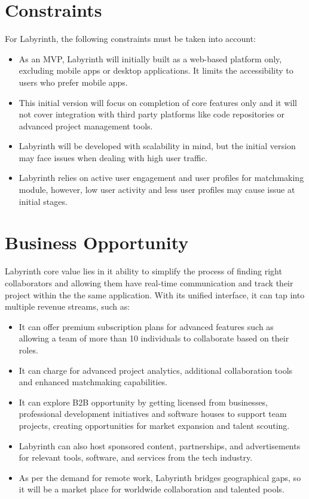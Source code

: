 \documentclass{FastFyp}
\begin{document}
\section{Constraints}
For Labyrinth, the following constraints must be taken into account:
\begin{itemize}
    \item As an MVP, Labyrinth will initially built as a web-based platform only, excluding mobile apps or desktop applications. It limits the accessibility to users who prefer mobile apps.
    \item This initial version will focus on completion of core features only and it will not cover integration with third party platforms like code repositories or advanced project management tools.
    \item Labyrinth will be developed with scalability in mind, but the initial version may face issues when dealing with high user traffic.
    \item Labyrinth relies on active user engagement and user profiles for matchmaking module, however, low user activity and less user profiles may cause issue at initial stages.
\end{itemize}
\section{Business Opportunity}
Labyrinth core value lies in it ability to simplify the process of finding right collaborators and allowing them have real-time communication and track their project within the the same application. With its unified interface, it can tap into multiple revenue streams, such as:
\begin{itemize}
    \item It can offer premium subscription plans for advanced features such as allowing a team of more than 10 individuals to collaborate based on their roles.
    \item It can charge for advanced project analytics, additional collaboration tools and enhanced matchmaking capabilities.
    \item It can explore B2B opportunity by getting licensed from businesses, professional development initiatives and software houses to support team projects, creating opportunities for market expansion and talent scouting.
    \item Labyrinth can also host sponsored content, partnerships, and advertisements for relevant tools, software, and services from the tech industry.
    \item As per the demand for remote work, Labyrinth bridges geographical gaps, so it will be a market place for worldwide collaboration and talented pools.
\end{itemize} 
\end{document}
